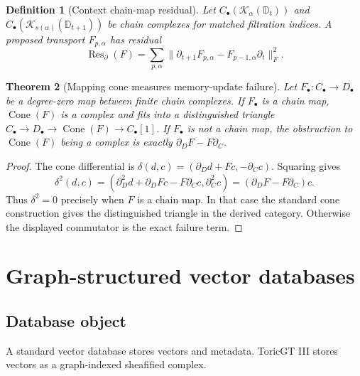 \documentclass[11pt]{article}
\newtheorem{theorem}{Theorem}[section]
\newtheorem{definition}[theorem]{Definition}
\newcommand{\calK}{\mathcal{K}}
\numberwithin{equation}{section}
\begin{document}
\begin{definition}[Context chain-map residual]
Let $C_\bullet(\calK_\alpha(\mathbb{D}_t))$ and $C_\bullet(\calK_{s(\alpha)}(\mathbb{D}_{t+1}))$ be chain complexes for matched filtration indices. A proposed transport $F_{p,\alpha}$ has residual
\begin{equation}
\operatorname{Res}_{\partial}(F)=\sum_{p,\alpha}\|\partial_{t+1}F_{p,\alpha}-F_{p-1,\alpha}\partial_t\|_F^2.
\end{equation}
\end{definition}

\begin{theorem}[Mapping cone measures memory-update failure]
Let $F_\bullet:C_\bullet\to D_\bullet$ be a degree-zero map between finite chain complexes. If $F_\bullet$ is a chain map, $\operatorname{Cone}(F)$ is a complex and fits into a distinguished triangle $C_\bullet\to D_\bullet\to\operatorname{Cone}(F)\to C_\bullet[1]$. If $F_\bullet$ is not a chain map, the obstruction to $\operatorname{Cone}(F)$ being a complex is exactly $\partial_DF-F\partial_C$.
\end{theorem}
\begin{proof}
The cone differential is $\delta(d,c)=(\partial_Dd+Fc,-\partial_Cc)$. Squaring gives
\begin{equation}
\delta^2(d,c)=(\partial_D^2d+\partial_DFc-F\partial_Cc,\partial_C^2c)=(\partial_DF-F\partial_C)c.
\end{equation}
Thus $\delta^2=0$ precisely when $F$ is a chain map. In that case the standard cone construction gives the distinguished triangle in the derived category. Otherwise the displayed commutator is the exact failure term.
\end{proof}

\section{Graph-structured vector databases}
\subsection{Database object}
A standard vector database stores vectors and metadata. ToricGT III stores vectors as a graph-indexed sheafified complex.
\end{document}
